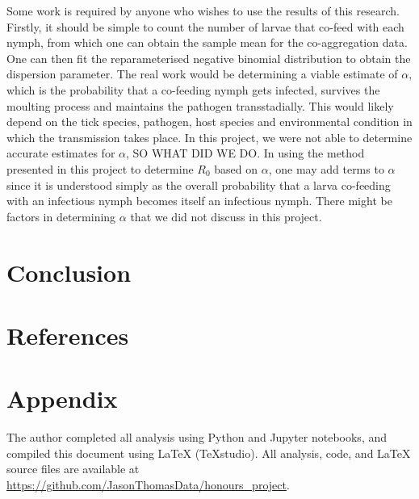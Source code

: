 \documentclass{article}
\begin{document}
Some work is required by anyone who wishes to use the results of this research. Firstly, it should be simple to count the number of larvae that co-feed with each nymph, from which one can obtain the sample mean for the co-aggregation data. One can then fit the reparameterised negative binomial distribution to obtain the dispersion parameter. The real work would be determining a viable estimate of $ \alpha $, which is the probability that a co-feeding nymph gets infected, survives the moulting process and maintains the pathogen transstadially. This would likely depend on the tick species, pathogen, host species and environmental condition in which the transmission takes place. In this project, we were not able to determine accurate estimates for $ \alpha $, SO WHAT DID WE DO. In using the method presented in this project to determine $ R_0 $ based on $ \alpha $, one may add terms to $ \alpha $ since it is understood simply as the overall probability that a larva co-feeding with an infectious nymph becomes itself an infectious nymph. There might be factors in determining $ \alpha $ that we did not discuss in this project.

\section{Conclusion}
 
\newpage

\nocite{*}

\section{References}
\printbibliography[heading=none]

\section{Appendix}

The author completed all analysis using Python and Jupyter notebooks, and compiled this document using LaTeX (TeXstudio). All analysis, code, and LaTeX source files are available at \url{https://github.com/JasonThomasData/honours_project}.
\end{document}
